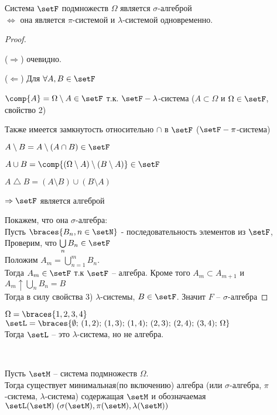 
\begin{lemma}
	Система $\setF$ подмножеств $\Omega$ является $\sigma$-алгеброй \\
	$\Leftrightarrow$ она является $\pi$-системой и $\lambda$-системой одновременно.
	
	\begin{proof}~

		($\Rightarrow$) очевидно.

		($\Leftarrow$) Для $\forall A, B \in \setF$

		$\comp{A} = \Omega \setminus A \in \setF$ т.к. $\setF - \lambda$-система ($A \subset \Omega$ и $\Omega \in \setF$, свойство 2)
		
		
		Также имеется замкнутость относительно $\cap$ в $\setF$ 
		($\setF - \pi$-система) 

		$A \setminus B = A \setminus (A \cap B) \in \setF$
		
		$A \cup B = \comp {(\Omega \setminus A) \setminus (B \setminus A)} \in \setF$

		$A \bigtriangleup B = (A \setminus B) \cup (B \setminus A)$
		
		$\Rightarrow \setF$ является алгеброй

		Покажем, что она $\sigma$-алгебра:\\
		Пусть $\braces{ B_n, n \in \setN }$ - последовательность элементов из $\setF$, 
		Проверим, что $\bigcup\limits_{n} B_n \in \setF$\\
		
		Положим $A_m = \bigcup\limits_{n = 1}^{m} B_n$. \\
		Тогда $A_m \in \setF$ т.к $\setF$ -- алгебра. Кроме того $A_m \subset A_{m + 1}$ и
		$A_m \uparrow \bigcup\limits_n B_n = B$ \\
		
		Тогда в силу свойства 3) $\lambda$-системы, $B \in \setF$. Значит $F$ -- $\sigma$-алгебра
		
	\end{proof}
\end{lemma}

\begin{example}
	$\Omega = \braces{ 1, 2, 3, 4 }$\\
	$\setL = \braces{ \emptyset;\, (1, 2);\, (1, 3);\, 
	(1, 4);\, (2, 3);\, (2, 4);\, (3, 4);\, \Omega }$\\
	Тогда $\setL$ -- это $\lambda$-система, но не алгебра.
\end{example}

\begin{lemma}~

	Пусть $\setM$ -- система подмножеств $\Omega$.\\
	Тогда существует минимальная(по включению) алгебра 
	(или $\sigma$-алгебра, $\pi$-система, $\lambda$-система) содержащая $\setM$ и обозначаемая
	$\setL(\setM)\; (\sigma(\setM), \pi(\setM), \lambda(\setM))$
\end{lemma}

